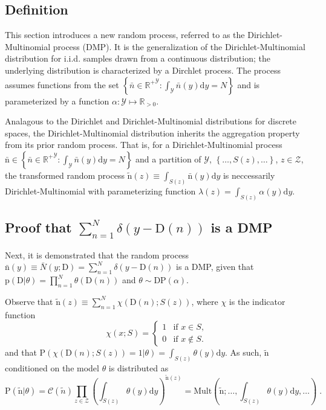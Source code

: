 \documentclass[12pt]{report}
\begin{document}
\subsection{Definition}

This section introduces a new random process, referred to as the Dirichlet-Multinomial process (DMP). It is the generalization of the Dirichlet-Multinomial distribution for i.i.d. samples drawn from a continuous distribution; the underlying distribution is characterized by a Dirchlet process. The process assumes functions from the set $\left\{ \bar{n} \in {\mathbb{R}^+}^\mathcal{Y} : \int_\mathcal{Y} \bar{n}(y) \mathrm{d}y = N \right\}$ and is parameterized by a function $\alpha : \mathcal{Y} \mapsto \mathbb{R}_{>0}$.

Analagous to the Dirichlet and Dirichlet-Multinomial distributions for discrete spaces, the Dirichlet-Multinomial distribution inherits the aggregation property from its prior random process. That is, for a Dirichlet-Multinomial process $\bar{\mathrm{n}} \in \left\{ \bar{n} \in {\mathbb{R}^+}^\mathcal{Y} : \int_\mathcal{Y} \bar{n}(y) \mathrm{d}y = N \right\}$ and a partition of $\mathcal{Y}$, $\left\{ \ldots,S(z),\ldots \right\}$, $z \in \mathcal{Z}$, the transformed random process $\tilde{\mathrm{n}}(z) \equiv \int_{S(z)} \bar{\mathrm{n}}(y) \mathrm{d}y$ is neccessarily Dirichlet-Multinomial with parameterizing function $\lambda(z) = \int_{S(z)} \alpha(y) \mathrm{d}y$.


\subsection{Proof that $\sum_{n=1}^N \delta(y-\mathrm{D}(n))$ is a DMP}

Next, it is demonstrated that the random process $\bar{\mathrm{n}}(y) \equiv \bar{N}(y;\mathrm{D}) = \sum_{n=1}^N \delta(y-\mathrm{D}(n))$ is a DMP, given that $\text{p}(\mathrm{D}|\theta) = \prod_{n=1}^N \theta(\mathrm{D}(n))$ and $\theta \sim \text{DP}(\alpha)$.

Observe that $\tilde{\mathrm{n}}(z) \equiv \sum_{n=1}^N \chi(\mathrm{D}(n);S(z))$, where $\chi$ is the indicator function
\begin{equation}
\chi(x;S) = \begin{cases} 1 & \text{if } x \in S, \\ 0 & \text{if } x \notin S.  \end{cases}
\end{equation}
and that $\text{P}(\chi(\mathrm{D}(n);S(z)) = 1 | \theta) = \int_{S(z)} \theta(y) \mathrm{d}y$. As such, $\tilde{\mathrm{n}}$ conditioned on the model $\theta$ is distributed as 
\begin{equation}
\text{P}(\tilde{\mathrm{n}} | \theta) = \mathcal{C}(\tilde{n}) \prod_{z \in \mathcal{Z}} \left( \int_{S(z)} \theta(y) \mathrm{d}y \right)^{\tilde{\mathrm{n}}(z)} = \text{Mult}\left( \tilde{\mathrm{n}} ; \ldots,\int_{S(z)} \theta(y) \mathrm{d}y,\ldots \right)  \;.
\end{equation}
\end{document}
